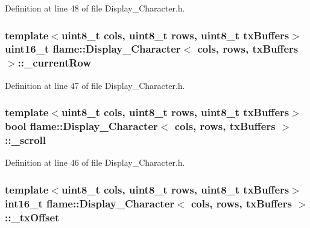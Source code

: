 Definition at line 48 of file Display\-\_\-\-Character.\-h.

\hypertarget{classflame_1_1_display___character_a04d2c6e9c31084e353be57fa53d97285}{
\subsubsection[{\-\_\-current\-Row}]{\setlength{\rightskip}{0pt plus 5cm}template$<$uint8\-\_\-t cols, uint8\-\_\-t rows, uint8\-\_\-t tx\-Buffers$>$ uint16\-\_\-t {\bf flame\-::\-Display\-\_\-\-Character}$<$ cols, rows, tx\-Buffers $>$\-::\-\_\-current\-Row\hspace{0.3cm}{\ttfamily [protected]}}}\label{classflame_1_1_display___character_a04d2c6e9c31084e353be57fa53d97285}


Definition at line 47 of file Display\-\_\-\-Character.\-h.

\hypertarget{classflame_1_1_display___character_a6216cd7f9631ec8851b2d2ed6a5c2728}{
\subsubsection[{\-\_\-scroll}]{\setlength{\rightskip}{0pt plus 5cm}template$<$uint8\-\_\-t cols, uint8\-\_\-t rows, uint8\-\_\-t tx\-Buffers$>$ bool {\bf flame\-::\-Display\-\_\-\-Character}$<$ cols, rows, tx\-Buffers $>$\-::\-\_\-scroll\hspace{0.3cm}{\ttfamily [protected]}}}\label{classflame_1_1_display___character_a6216cd7f9631ec8851b2d2ed6a5c2728}


Definition at line 46 of file Display\-\_\-\-Character.\-h.

\hypertarget{classflame_1_1_display___character_a90abfe03430c90c0d50469f7e99c6c5c}{
\subsubsection[{\-\_\-tx\-Offset}]{\setlength{\rightskip}{0pt plus 5cm}template$<$uint8\-\_\-t cols, uint8\-\_\-t rows, uint8\-\_\-t tx\-Buffers$>$ int16\-\_\-t {\bf flame\-::\-Display\-\_\-\-Character}$<$ cols, rows, tx\-Buffers $>$\-::\-\_\-tx\-Offset\hspace{0.3cm}{\ttfamily [protected]}}}\label{classflame_1_1_display___character_a90abfe03430c90c0d50469f7e99c6c5c}


